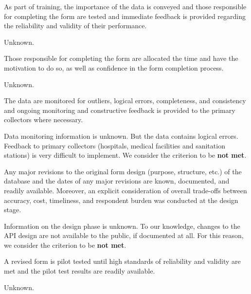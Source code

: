\begin{QandA}
    \item As part of training, the importance of the data is conveyed and those responsible for completing the form are tested and immediate feedback is provided regarding the reliability and validity of their performance.
    \begin{answered}
        Unknown.
    \end{answered}

    \item Those responsible for completing the form are allocated the time and have the motivation to do so, as well as confidence in the form completion process.
    \begin{answered}
        Unknown.
    \end{answered}

    \item The data are monitored for outliers, logical errors, completeness, and consistency and ongoing monitoring and constructive feedback is provided to the primary collectors where necessary.
    \begin{answered}
        Data monitoring information is unknown. But the data contains logical errors.
        Feedback to primary collectors (hospitals, medical facilities and sanitation stations) is very difficult to implement.
        We consider the criterion to be \textbf{not met}.
    \end{answered}

    \item Any major revisions to the original form design (purpose, structure, etc.) of the database and the dates of any major revisions are known, documented, and readily available. Moreover, an explicit consideration of overall trade-offs between accuracy, cost, timeliness, and respondent burden was conducted at the design stage.
    \begin{answered}
        Information on the design phase is unknown.
        To our knowledge, changes to the API design are not available to the public, if documented at all.
        For this reason, we consider the criterion to be \textbf{not met}.
    \end{answered}

    \item A revised form is pilot tested until high standards of reliability and validity are met and the pilot test results are readily available.
    \begin{answered}
        Unknown.
    \end{answered}

\end{QandA}

